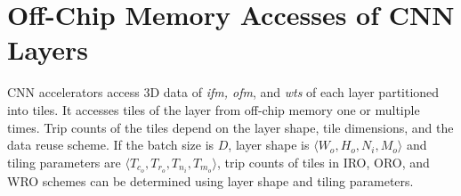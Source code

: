 \section{Off-Chip Memory Accesses of CNN Layers}\label{MemAccess_CNN}
\begin{comment}
A CNN accelerator accesses 3D data of \textit{ifm, ofm}, and \textit{wts} of each layer partitioned into tiles. It accesses tiles of the layer from off-chip memory one or multiple times. Trip counts of the tiles depend on the layer shape, tile dimensions, and the data reuse scheme. If the batch size is $D$, layer shape is $\langle W_o,H_o,N_i,M_o\rangle$ and tiling parameters are $\langle T_{c_o},T_{r_o},T_{n_i},T_{m_o}\rangle$, trip counts of tiles in IRO, ORO, and WRO schemes can be expressed as the rows of the matrix $\mathbf{R}$ in ~\eqref{eq:TripCount}, where columns represent \textit{ifm, ofm}, and \textit{wts} trip counts.
\begin{align}\label{eq:TripCount}
	\mathbf{R}=
	\begin{bmatrix}
		\mathbf{r}_{iro} \\  \mathbf{r}_{oro} \\ \mathbf{r}_{wro} \\
	\end{bmatrix}=
	\begin{bmatrix}
		D&(2\ceil[\big]{\frac{N_i}{T_{n_i}}}-1)D&\ceil[\big]{\frac{H_o}{T_{r_o}}}\ceil[\big]{\frac{W_o}{T_{c_o}}}D\\[6pt]
		\ceil[\big]{\frac{M_o}{T_{m_o}}}D&D&\ceil[\big]{\frac{H_o}{T_{r_o}}}\ceil[\big]{\frac{W_o}{T_{c_o}}} D\\[6pt]
		\ceil[\big]{\frac{M_o}{T_{m_o}}}D&(2\ceil[\big]{\frac{N_i}{T_{n_i}}}-1)D&1\\
	\end{bmatrix}
\end{align}
\end{comment}
CNN accelerators access 3D data of \textit{ifm, ofm}, and \textit{wts} of each layer partitioned into tiles. It accesses tiles of the layer from off-chip memory one or multiple times. Trip counts of the tiles depend on the layer shape, tile dimensions, and the data reuse scheme. If the batch size is $D$, layer shape is $\langle W_o,H_o,N_i,M_o\rangle$ and tiling parameters are $\langle T_{c_o},T_{r_o},T_{n_i},T_{m_o}\rangle$, trip counts of tiles in IRO, ORO, and WRO schemes can be determined using layer shape and tiling parameters. 
